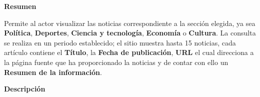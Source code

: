 

\begin{large}
	\textbf{Resumen}\\
\end{large}

Permite al actor visualizar las noticias correspondiente a la sección elegida,
ya sea \textbf{Política}, \textbf{Deportes}, \textbf{Ciencia y tecnología}, \textbf{Economía}
o \textbf{Cultura}. La consulta se realiza en un periodo establecido; el sitio muestra hasta 15
 noticias, cada artículo contiene el \textbf{Título}, la \textbf{Fecha de publicación}, \textbf{URL} el cual direcciona a la página fuente que ha proporcionado la noticias y de contar con ello  un
\textbf{Resumen de la información}.\\

\begin{large}
	\textbf{Descripción}\\
\end{large}



